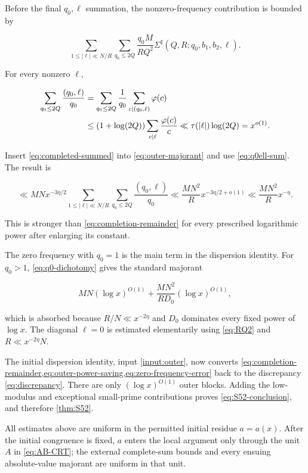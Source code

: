 Before the final $q_0,\ell$ summation, the nonzero-frequency contribution is
bounded by

\begin{equation}\label{eq:outer-majorant}
 \sum_{1\le|\ell|\ll N/R}\sum_{q_0\le2Q}
 \frac{q_0M}{RQ^2}
 \Sigma^\sharp(Q,R;q_0,b_1,b_2,\ell).
\end{equation}

For every nonzero $\ell$,

\begin{align}
 \sum_{q_0\le2Q}\frac{(q_0,\ell)}{q_0}
 &=\sum_{q_0\le2Q}\frac1{q_0}
   \sum_{c\mid(q_0,\ell)}\varphi(c)\notag\\
 &\le(1+\log(2Q))\sum_{c\mid\ell}\frac{\varphi(c)}c
 \ll\tau(|\ell|)\log(2Q)=x^{o(1)}.
 \label{eq:q0ell-sum}
\end{align}

Insert \cref{eq:completed-summed} into \cref{eq:outer-majorant} and use
\cref{eq:q0ell-sum}.  The result is

\begin{equation}\label{eq:outer-power-saving}
 \ll MNx^{-3\eta/2}
 \sum_{1\le |\ell|\ll N/R}
 \sum_{q_0\le 2Q}\frac{(q_0,\ell)}{q_0}
 \ll\frac{MN^2}{R}x^{-3\eta/2+o(1)}
 \ll\frac{MN^2}{R}x^{-\eta}.
\end{equation}

This is stronger than \cref{eq:completion-remainder} for every prescribed
logarithmic power after enlarging its constant.

The zero frequency with $q_0=1$ is the main term in the dispersion identity.
For $q_0>1$, \cref{eq:q0-dichotomy} gives the standard majorant

\begin{equation}\label{eq:zero-frequency-error}
 MN(\log x)^{O(1)}+
 \frac{MN^2}{RD_0}(\log x)^{O(1)},
\end{equation}

which is absorbed because $R/N\ll x^{-2\eta}$ and $D_0$ dominates every
fixed power of $\log x$.  The diagonal $\ell=0$ is estimated elementarily
using \cref{eq:RQ2} and $R\ll x^{-2\eta}N$.

The initial dispersion identity, input \ref{input:outer}, now converts
\cref{eq:completion-remainder,eq:outer-power-saving,eq:zero-frequency-error}
back to the discrepancy \cref{eq:discrepancy}.  There are only
$(\log x)^{O(1)}$ outer blocks.  Adding the low-modulus and exceptional
small-prime contributions proves \cref{eq:S52-conclusion}, and therefore
\cref{thm:S52}.

All estimates above are uniform in the permitted initial residue $a=a(x)$.
After the initial congruence is fixed, $a$ enters the local argument only
through the unit $A$ in \cref{eq:AB-CRT}; the external complete-sum bounds
and every ensuing absolute-value majorant are uniform in that unit.

